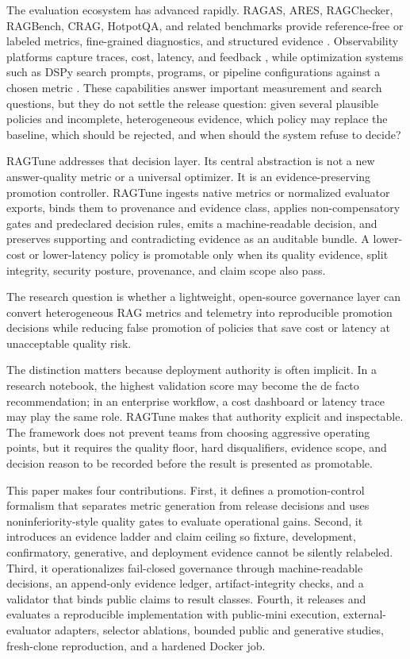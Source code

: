 \documentclass[11pt]{article}
\begin{document}
The evaluation ecosystem has advanced rapidly. RAGAS, ARES, RAGChecker, RAGBench, CRAG, HotpotQA, and related benchmarks provide reference-free or labeled metrics, fine-grained diagnostics, and structured evidence \cite{ref3,ref4,ref5,ref6,ref7,ref8,ref10}. Observability platforms capture traces, cost, latency, and feedback \cite{ref18,ref19}, while optimization systems such as DSPy search prompts, programs, or pipeline configurations against a chosen metric \cite{ref9}. These capabilities answer important measurement and search questions, but they do not settle the release question: given several plausible policies and incomplete, heterogeneous evidence, which policy may replace the baseline, which should be rejected, and when should the system refuse to decide?

RAGTune addresses that decision layer. Its central abstraction is not a new answer-quality metric or a universal optimizer. It is an evidence-preserving promotion controller. RAGTune ingests native metrics or normalized evaluator exports, binds them to provenance and evidence class, applies non-compensatory gates and predeclared decision rules, emits a machine-readable decision, and preserves supporting and contradicting evidence as an auditable bundle. A lower-cost or lower-latency policy is promotable only when its quality evidence, split integrity, security posture, provenance, and claim scope also pass.

The research question is whether a lightweight, open-source governance layer can convert heterogeneous RAG metrics and telemetry into reproducible promotion decisions while reducing false promotion of policies that save cost or latency at unacceptable quality risk.

The distinction matters because deployment authority is often implicit. In a research notebook, the highest validation score may become the de facto recommendation; in an enterprise workflow, a cost dashboard or latency trace may play the same role. RAGTune makes that authority explicit and inspectable. The framework does not prevent teams from choosing aggressive operating points, but it requires the quality floor, hard disqualifiers, evidence scope, and decision reason to be recorded before the result is presented as promotable.

This paper makes four contributions. First, it defines a promotion-control formalism that separates metric generation from release decisions and uses noninferiority-style quality gates to evaluate operational gains. Second, it introduces an evidence ladder and claim ceiling so fixture, development, confirmatory, generative, and deployment evidence cannot be silently relabeled. Third, it operationalizes fail-closed governance through machine-readable decisions, an append-only evidence ledger, artifact-integrity checks, and a validator that binds public claims to result classes. Fourth, it releases and evaluates a reproducible implementation with public-mini execution, external-evaluator adapters, selector ablations, bounded public and generative studies, fresh-clone reproduction, and a hardened Docker job.
\end{document}
